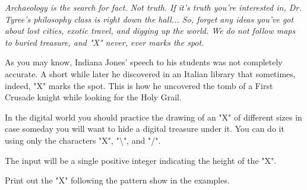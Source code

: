 
\Statement

\textit{Archaeology is the search for fact. Not truth. If it's truth you're
 interested in, Dr. Tyree's philosophy class is right down the hall... So,
 forget any ideas you've got about lost cities, exotic travel, and digging up
 the world. We do not follow maps to buried treasure, and "X" never, ever
 marks the spot.}


\medskip

As you may know, Indiana Jones' speech to his students was not completely
accurate. A short while later he discovered in an Italian library that
sometimes, indeed, "X" marks the spot. This is how he uncovered the tomb of a
First Crusade knight while looking for the Holy Grail.

\medskip

In the digital world you should practice the drawing of an "X" of different
sizes in case someday you will want to hide a digital treasure under it. You
can do it using only the characters "X", "\textbackslash", and "/".

\Input

The input will be a single positive integer indicating the height of the "X".

\Output

Print out the "X" following the pattern show in the examples.

\medskip

\Sample
